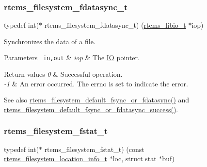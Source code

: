 \subsubsection{\texorpdfstring{rtems\_filesystem\_fdatasync\_t}{rtems\_filesystem\_fdatasync\_t}}
{\footnotesize\ttfamily typedef int($\ast$ rtems\+\_\+filesystem\+\_\+fdatasync\+\_\+t) (\mbox{\hyperlink{structrtems__libio__tt}{rtems\+\_\+libio\+\_\+t}} $\ast$iop)}



Synchronizes the data of a file. 


\begin{DoxyParams}[1]{Parameters}
\mbox{\texttt{ in,out}}  & {\em iop} & The \mbox{\hyperlink{structIO}{IO}} pointer.\\
\hline
\end{DoxyParams}

\begin{DoxyRetVals}{Return values}
{\em 0} & Successful operation. \\
\hline
{\em -\/1} & An error occurred. The errno is set to indicate the error.\\
\hline
\end{DoxyRetVals}
\begin{DoxySeeAlso}{See also}
\mbox{\hyperlink{group__LibIOFSHandler_ga7bcb245cbe4a71b0952beca086b63e1b}{rtems\+\_\+filesystem\+\_\+default\+\_\+fsync\+\_\+or\+\_\+fdatasync()}} and \mbox{\hyperlink{group__LibIOFSHandler_ga9447b9dc7947e64bde539307a8c0cdb5}{rtems\+\_\+filesystem\+\_\+default\+\_\+fsync\+\_\+or\+\_\+fdatasync\+\_\+success()}}. 
\end{DoxySeeAlso}
\mbox{\label{group__LibIOFSHandler_gabdbd09354c4e86c79735da3a1dc340a8}} 
\subsubsection{\texorpdfstring{rtems\_filesystem\_fstat\_t}{rtems\_filesystem\_fstat\_t}}
{\footnotesize\ttfamily typedef int($\ast$ rtems\+\_\+filesystem\+\_\+fstat\+\_\+t) (const \mbox{\hyperlink{group__LibIO_ga3252b3d31ee3c49ffff0b7604a676864}{rtems\+\_\+filesystem\+\_\+location\+\_\+info\+\_\+t}} $\ast$loc, struct stat $\ast$buf)}



